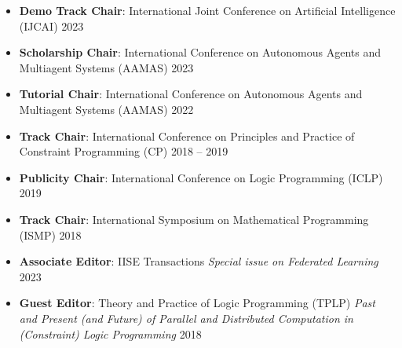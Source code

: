   \begin{itemize}

    \item {\bf Demo Track Chair}: 
    International Joint Conference on Artificial Intelligence (IJCAI)
    \hfill{2023}

    \item {\bf Scholarship Chair}: 
    International Conference on Autonomous Agents and Multiagent Systems (AAMAS)
    \hfill{2023}

    \item {\bf Tutorial Chair}: 
    International Conference on Autonomous Agents and Multiagent Systems (AAMAS)
    \hfill{2022}
    
  \item {\bf Track Chair}: 
  {International Conference on Principles and Practice of Constraint Programming (CP)}
    \hfill{2018 -- 2019}

  \item {\bf Publicity Chair}: {International Conference on Logic Programming (ICLP)}
  \hfill{2019}

  \item {\bf Track Chair}: {International Symposium on Mathematical Programming (ISMP)}
  \hfill{2018}
 
  \end{itemize}

  \begin{itemize}
    \item {\bf Associate Editor}: IISE Transactions
    \emph{Special issue on Federated Learning} \hfill{2023}

  \item {\bf Guest Editor}: {Theory and Practice of Logic Programming (TPLP)}
  \emph{Past and Present (and Future) of Parallel and Distributed Computation in (Constraint) Logic Programming} 
  \hfill {2018}
\end{itemize}


